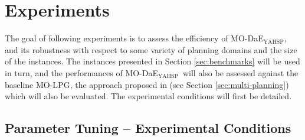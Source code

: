 \documentclass{article}
\newcommand{\MODAEYAHSP}{{\sc MO-DaE$_{\text{YAHSP}}$}}
\newcommand{\MOLPG}{{\sc MO-LPG}}
\newcommand{\OPENSTACKS}{{\sc Openstacks}}
\begin{document}


\section{Experiments}
\label{sec:experiments}

The goal of following experiments is to assess the efficiency of \MODAEYAHSP, and its robustness with respect to some variety of planning domains and the size of the instances. The instances presented in Section \ref{sec:benchmarks} will be used in turn, and the performances of \MODAEYAHSP\ will also be assessed against the baseline \MOLPG, the approach proposed in \cite{LPG-PlanSIG2012} (see Section \ref{sec:multi-planning}) which will also be evaluated. The experimental conditions will first be detailed.


\subsection{Parameter Tuning -- Experimental Conditions}
\label{sec:conditions}
\end{document}
